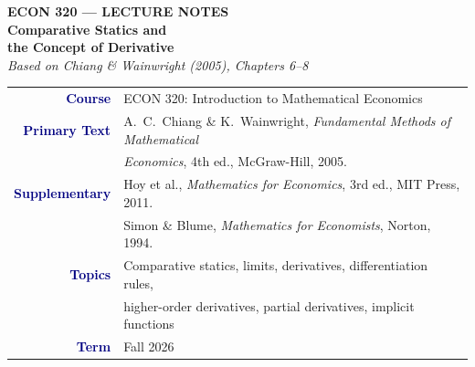 \documentclass[12pt, a4paper]{article}
\theoremstyle{definition}
\begin{document}

\thispagestyle{empty}

\vspace*{-1.6cm}
\begin{center}
  {\color{white}\large\bfseries\sffamily ECON 320 --- LECTURE NOTES}\\[10pt]
  {\color{white}\Huge\bfseries Comparative Statics and}\\[6pt]
  {\color{white}\Huge\bfseries the Concept of Derivative}\\[10pt]
  {\color{gold}\large\itshape
    Based on Chiang \& Wainwright (2005), Chapters 6--8}
\end{center}

\vspace{3.6cm}
\begin{center}
\begin{tabular}{r l}
  \textbf{\textcolor{navy}{Course}}         & ECON 320: Introduction to Mathematical Economics \\[3pt]
  \textbf{\textcolor{navy}{Primary Text}}   & A.\ C.\ Chiang \& K.\ Wainwright,
                                              \textit{Fundamental Methods of Mathematical}\\
                                            & \textit{Economics}, 4th ed., McGraw-Hill, 2005. \\[3pt]
  \textbf{\textcolor{navy}{Supplementary}}  & Hoy et al., \textit{Mathematics for Economics},
                                              3rd ed., MIT Press, 2011. \\[2pt]
                                            & Simon \& Blume, \textit{Mathematics for Economists},
                                              Norton, 1994. \\[3pt]
  \textbf{\textcolor{navy}{Topics}}         & Comparative statics, limits, derivatives,
                                              differentiation rules,\\
                                            & higher-order derivatives, partial derivatives,
                                              implicit functions \\[3pt]
  \textbf{\textcolor{navy}{Term}}           & Fall 2026 \\
\end{tabular}
\end{center}
\end{document}
